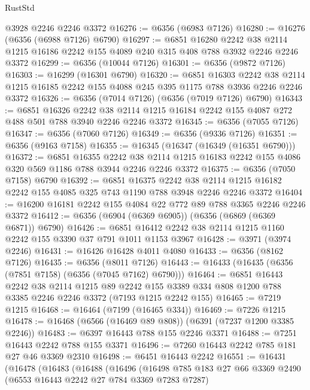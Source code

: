 \begin{lexlean}{RustStd}
\begin{coremodule}
    @3928
    @2246
    @2246
    @3372
@16276 := @6356 (@6983 @7126)
@16280 := @16276 (@6356 (@6988 @7126) @6790)
@16297 := @6851
    @16280
    @2242
    @38
    @2114
    @1215
    @16186
    @2242
    @155
    @4089
    @240
    @315
    @408
    @788
    @3932
    @2246
    @2246
    @3372
@16299 := @6356 (@10044 @7126)
@16301 := @6356 (@9872 @7126)
@16303 := @16299 (@16301 @6790)
@16320 := @6851
    @16303
    @2242
    @38
    @2114
    @1215
    @16185
    @2242
    @155
    @4088
    @245
    @395
    @1175
    @788
    @3936
    @2246
    @2246
    @3372
@16326 := @6356 (@7014 @7126) (@6356 (@7019 @7126) @6790)
@16343 := @6851
    @16326
    @2242
    @38
    @2114
    @1215
    @16184
    @2242
    @155
    @4087
    @272
    @488
    @501
    @788
    @3940
    @2246
    @2246
    @3372
@16345 := @6356 (@7055 @7126)
@16347 := @6356 (@7060 @7126)
@16349 := @6356 (@9336 @7126)
@16351 := @6356 (@9163 @7158)
@16355 := @16345 (@16347 (@16349 (@16351 @6790)))
@16372 := @6851
    @16355
    @2242
    @38
    @2114
    @1215
    @16183
    @2242
    @155
    @4086
    @320
    @569
    @1186
    @788
    @3944
    @2246
    @2246
    @3372
@16375 := @6356 (@7050 @7158) @6790
@16392 := @6851
    @16375
    @2242
    @38
    @2114
    @1215
    @16182
    @2242
    @155
    @4085
    @325
    @743
    @1190
    @788
    @3948
    @2246
    @2246
    @3372
@16404 := @16200 @16181 @2242 @155 @4084 @22 @772 @89 @788 @3365 @2246 @2246 @3372
@16412 := @6356 (@6904 (@6369 @6905)) (@6356 (@6869 (@6369 @6871)) @6790)
@16426 := @6851 @16412 @2242 @38 @2114 @1215 @1160 @2242 @155 @3390 @37 @791 @1011 @1153 @3967
@16428 := @3971 (@3974 @2246)
@16431 := @16426 @16428 @4011 @4080
@16433 := @6356 (@8162 @7126)
@16435 := @6356 (@8011 @7126)
@16443 := @16433 (@16435 (@6356 (@7851 @7158) (@6356 (@7045 @7162) @6790)))
@16464 := @6851
    @16443
    @2242
    @38
    @2114
    @1215
    @89
    @2242
    @155
    @3389
    @334
    @808
    @1200
    @788
    @3385
    @2246
    @2246
    @3372
    (@7193 @1215 @2242 @155)
@16465 := @7219 @1215
@16468 := @16464 (@7199 (@16465 @334))
@16469 := @7226 @1215
@16478 := @16468 (@6566 (@16469 @89 @808)) (@6391 (@7237 @1200 @3385 @2246))
@16483 := @6397 @16443 @788 @155 @2246 @3371
@16488 := @7251 @16443 @2242 @788 @155 @3371
@16496 := @7260 @16443 @2242 @785 @181 @27 @46 @3369 @2310
@16498 := @6451 @16443 @2242
@16551 := @16431
    (@16478
      (@16483
        (@16488
          (@16496
            (@16498
              @785
              @183
              @27
              @66
              @3369
              @2490
              (@6553 @16443 @2242 @27 @784 @3369 @7283 @7287)

\end{coremodule}
\end{lexlean}

